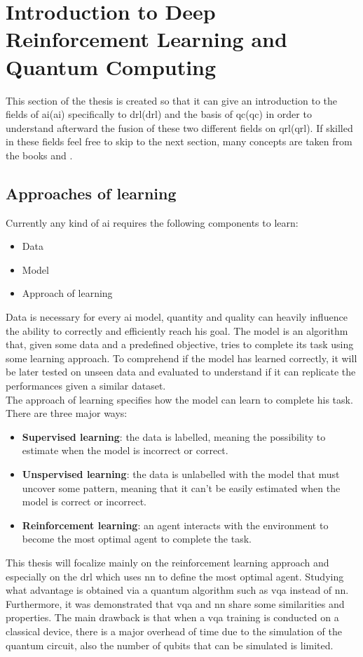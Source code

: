 \section{Introduction to Deep Reinforcement Learning and Quantum Computing}
This section of the thesis is created so that it can give an introduction to the fields of \acrlong{ai}(\acrshort{ai}) specifically to \acrlong{drl}(\acrshort{drl}) and the basis of \acrlong{qc}(\acrshort{qc}) in order to understand afterward the fusion of these two different fields on \acrlong{qrl}(\acrshort{qrl}). If skilled in these fields feel free to skip to the next section, many concepts are taken from the books \cite{10.5555/3279266} and \cite{nielsen_chuang_2010}.
\subsection{Approaches of learning}
Currently any kind of \acrshort{ai} requires the following components to learn:
\begin{itemize}
	\item Data
	\item Model
	\item Approach of learning
\end{itemize}
Data is necessary for every \acrshort{ai} model, quantity and quality can heavily influence the ability to correctly and efficiently reach his goal. 
The model is an algorithm that, given some data and a predefined objective, tries to complete its task using some learning approach. To comprehend if the model has learned correctly, it will be later tested on unseen data and evaluated to understand if it can replicate the performances given a similar dataset.\\
The approach of learning specifies how the model can learn to complete his task. There are three major ways:
\begin{itemize}
	\item \textbf{Supervised learning}: the data is labelled, meaning the possibility to estimate when the model is incorrect or correct.
	\item \textbf{Unspervised learning}: the data is unlabelled with the model that must uncover some pattern, meaning that it can't be easily estimated when the model is correct or incorrect.
	\item \textbf{Reinforcement learning}: an agent interacts with the environment to become the most optimal agent to complete the task.
\end{itemize}
This thesis will focalize mainly on the reinforcement learning approach and especially on the \acrfull{drl} which uses \acrfull{nn} to define the most optimal agent. Studying what advantage is obtained via a quantum algorithm such as \acrfull{vqa} instead of \acrfull{nn}.\\
Furthermore, it was demonstrated that \acrshort{vqa} and \acrshort{nn} share some similarities and properties. The main drawback is that when a \acrshort{vqa} training is conducted on a classical device, there is a major overhead of time due to the simulation of the quantum circuit, also the number of qubits that can be simulated is limited.
